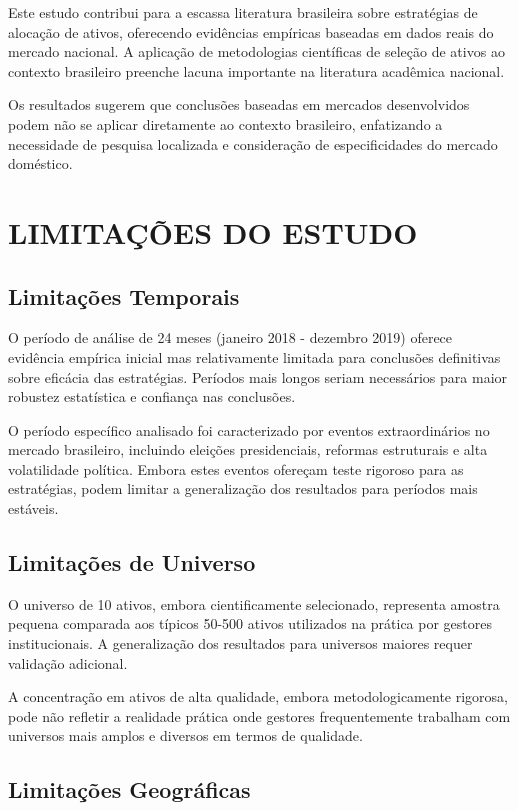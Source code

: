 Este estudo contribui para a escassa literatura brasileira sobre estratégias de alocação de ativos, oferecendo evidências empíricas baseadas em dados reais do mercado nacional. A aplicação de metodologias científicas de seleção de ativos ao contexto brasileiro preenche lacuna importante na literatura acadêmica nacional.

Os resultados sugerem que conclusões baseadas em mercados desenvolvidos podem não se aplicar diretamente ao contexto brasileiro, enfatizando a necessidade de pesquisa localizada e consideração de especificidades do mercado doméstico.

\section{LIMITAÇÕES DO ESTUDO}

\subsection{Limitações Temporais}

O período de análise de 24 meses (janeiro 2018 - dezembro 2019) oferece evidência empírica inicial mas relativamente limitada para conclusões definitivas sobre eficácia das estratégias. Períodos mais longos seriam necessários para maior robustez estatística e confiança nas conclusões.

O período específico analisado foi caracterizado por eventos extraordinários no mercado brasileiro, incluindo eleições presidenciais, reformas estruturais e alta volatilidade política. Embora estes eventos ofereçam teste rigoroso para as estratégias, podem limitar a generalização dos resultados para períodos mais estáveis.

\subsection{Limitações de Universo}

O universo de 10 ativos, embora cientificamente selecionado, representa amostra pequena comparada aos típicos 50-500 ativos utilizados na prática por gestores institucionais. A generalização dos resultados para universos maiores requer validação adicional.

A concentração em ativos de alta qualidade, embora metodologicamente rigorosa, pode não refletir a realidade prática onde gestores frequentemente trabalham com universos mais amplos e diversos em termos de qualidade.

\subsection{Limitações Geográficas}

